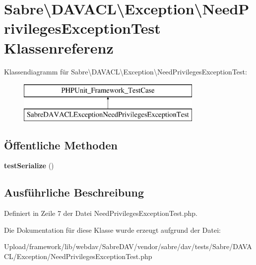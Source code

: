 \hypertarget{class_sabre_1_1_d_a_v_a_c_l_1_1_exception_1_1_need_privileges_exception_test}{}\section{Sabre\textbackslash{}D\+A\+V\+A\+CL\textbackslash{}Exception\textbackslash{}Need\+Privileges\+Exception\+Test Klassenreferenz}
\label{class_sabre_1_1_d_a_v_a_c_l_1_1_exception_1_1_need_privileges_exception_test}
Klassendiagramm für Sabre\textbackslash{}D\+A\+V\+A\+CL\textbackslash{}Exception\textbackslash{}Need\+Privileges\+Exception\+Test\+:\begin{figure}[H]
\begin{center}
\leavevmode
\includegraphics[height=2.000000cm]{class_sabre_1_1_d_a_v_a_c_l_1_1_exception_1_1_need_privileges_exception_test}
\end{center}
\end{figure}
\subsection*{Öffentliche Methoden}
\begin{DoxyCompactItemize}
\item 
\mbox{\label{class_sabre_1_1_d_a_v_a_c_l_1_1_exception_1_1_need_privileges_exception_test_a94e71d28f7df1466b19a109fb8830e58}} 
{\bfseries test\+Serialize} ()
\end{DoxyCompactItemize}


\subsection{Ausführliche Beschreibung}


Definiert in Zeile 7 der Datei Need\+Privileges\+Exception\+Test.\+php.



Die Dokumentation für diese Klasse wurde erzeugt aufgrund der Datei\+:\begin{DoxyCompactItemize}
\item 
Upload/framework/lib/webdav/\+Sabre\+D\+A\+V/vendor/sabre/dav/tests/\+Sabre/\+D\+A\+V\+A\+C\+L/\+Exception/Need\+Privileges\+Exception\+Test.\+php\end{DoxyCompactItemize}
